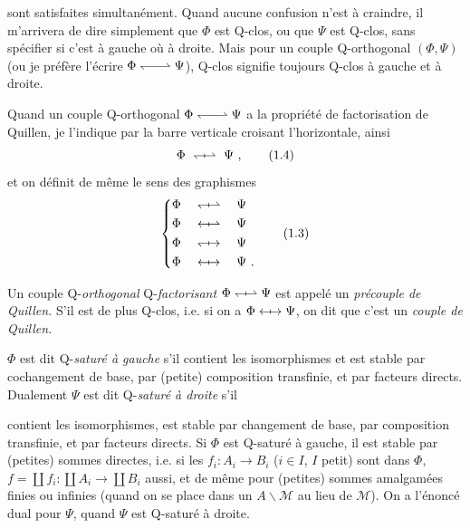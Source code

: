 \documentclass[11pt]{article}
\newcommand{\printedpage}[1]{\marginpar{\footnotesize p.~#1}}
\newcommand{\msp}[1]{\marginpar{\footnotesize [#1]}}
\newcommand{\Qo}{\mathrel{\leftharpoondown\joinrel\relbar\joinrel\rightharpoonup}}   %
\newcommand{\Qx}[2]{\mathrel{#1\joinrel\mapstochar#2}}
\begin{document}
\msp{page 2}

sont satisfaites simultanément. Quand aucune confusion n'est à craindre, il m'arrivera de dire simplement que $\Phi$ est Q-clos, ou que $\Psi$ est Q-clos, sans spécifier si c'est à gauche où %
à droite. Mais pour un couple Q-orthogonal $(\Phi, \Psi)$ (ou je préfère l'écrire $\Phi \Qo \Psi$), Q-clos %
signifie toujours Q-clos à gauche et à droite.

Quand un couple Q-orthogonal $\Phi \Qo \Psi$ a la propriété de factorisation de Quillen, je l'indique par la barre verticale croisant l'horizontale, ainsi
\[
\Phi \ \Qx{\leftharpoondown}{\rightharpoonup} \ \Psi\ ,
\tag*{(1.4)}
\]
et on définit de même le sens des graphismes
\[
\left\{
\begin{aligned}
&\Phi \quad \Qx{\leftharpoondown}{\rightharpoonup} \quad \Psi\\
&\Phi \quad \Qx{\leftarrow}{\rightharpoonup} \quad \Psi\\
&\Phi \quad \Qx{\leftharpoondown}{\rightarrow} \quad \Psi\\
&\Phi \quad \Qx{\leftarrow}{\rightarrow} \quad \Psi\ .
\end{aligned}
\right.
\tag*{(1.3)} %
\]

\newpage

\printedpage{2}

Un couple Q-\textit{orthogonal} Q-\textit{factorisant} $\Phi \Qx{\leftharpoondown}{\rightharpoonup} \Psi$ est appelé un \textit{précouple de Quillen.} S'il est de plus Q-clos, i.e. si on a $\Phi \Qx{\leftarrow}{\rightarrow} \Psi$, on dit que c'est un \textit{couple de Quillen.}

$\Phi$ est dit Q-\textit{saturé à gauche} s'il contient les isomorphismes et est stable par cochangement de base, par (petite) composition transfinie, et par facteurs directs. Dualement $\Psi$ est dit Q-\textit{saturé à droite} s'il

\msp{page 3}

contient les isomorphismes, est stable par changement de base, par composition transfinie, et par facteurs directs. Si $\Phi$ est Q-saturé à gauche, il est stable par (petites) sommes directes, i.e. si les $f_i : A_i \longrightarrow B_i$ ($i \in I$, $I$ petit) sont dans $\Phi$, $f = \coprod f_i : \coprod A_i \longrightarrow \coprod B_i$ aussi, et de même pour (petites) sommes amalgamées finies ou infinies (quand on se place dans un $A\backslash\mathcal{M}$ au lieu de $\mathcal{M}$). On a l'énoncé dual pour $\Psi$, quand $\Psi$ est Q-saturé à droite.
\end{document}
